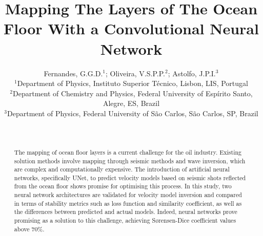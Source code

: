 \documentclass[a4paper,twoside,12pt]{article}
\title{Mapping The Layers of The Ocean Floor With a Convolutional Neural Network}
\author{%
Fernandes, G.G.D.$^1$; Oliveira, V.S.P.P.$^2$;  Astolfo, J.P.I.$^3$\\ %
\footnotesize $^1$Department of Physics, Instituto Superior Técnico, Lisbon, LIS, Portugal \\
\footnotesize $^2$Department of Chemistry and Physics, Federal University of Espírito Santo, Alegre, ES, Brazil \\
\footnotesize $^3$Department of Physics, Federal University of São Carlos, São Carlos, SP, Brazil \\ %
\vspace{-0mm}
}
\date{~~~}
\begin{document}
\maketitle %

\thispagestyle{fancy} %

\vspace{-2.0cm}

\begin{abstract}

\vspace{-3mm}
\noindent The mapping of ocean floor layers is a current challenge for the oil industry. Existing solution methods involve mapping through seismic methods and wave inversion, which are complex and computationally expensive. The introduction of artificial neural networks, specifically UNet, to predict velocity models based on seismic shots reflected from the ocean floor shows promise for optimising this process. In this study, two neural network architectures are validated for velocity model inversion and compared in terms of stability metrics such as loss function and similarity coefficient, as well as the differences between predicted and actual models. Indeed, neural networks prove promising as a solution to this challenge, achieving Sørensen-Dice coefficient values above 70\%.
\end{abstract}
\end{document}
